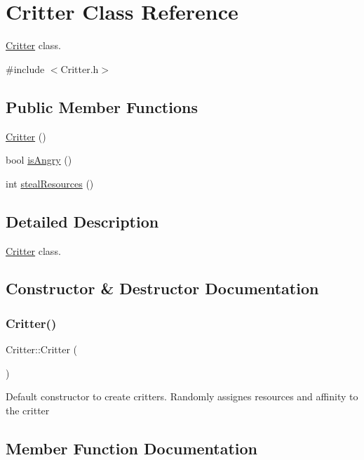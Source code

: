 \hypertarget{classCritter}{}\section{Critter Class Reference}
\label{classCritter}


\hyperlink{classCritter}{Critter} class.  




{\ttfamily \#include $<$Critter.\+h$>$}

\subsection*{Public Member Functions}
\begin{DoxyCompactItemize}
\item 
\hyperlink{classCritter_a05aa21e3b570d7380f3ead47c99442ef}{Critter} ()
\item 
bool \hyperlink{classCritter_ab8433b695b842ed8c5593e2f050329de}{is\+Angry} ()
\item 
int \hyperlink{classCritter_a222b3fd7953904ef94dbc0a795c3da56}{steal\+Resources} ()
\end{DoxyCompactItemize}


\subsection{Detailed Description}
\hyperlink{classCritter}{Critter} class. 

\subsection{Constructor \& Destructor Documentation}
\mbox{\label{classCritter_a05aa21e3b570d7380f3ead47c99442ef}} 
\subsubsection{\texorpdfstring{Critter()}{Critter()}}
{\footnotesize\ttfamily Critter\+::\+Critter (\begin{DoxyParamCaption}{ }\end{DoxyParamCaption})}

Default constructor to create critters. Randomly assignes resources and affinity to the critter 

\subsection{Member Function Documentation}
\mbox{\label{classCritter_ab8433b695b842ed8c5593e2f050329de}} 
